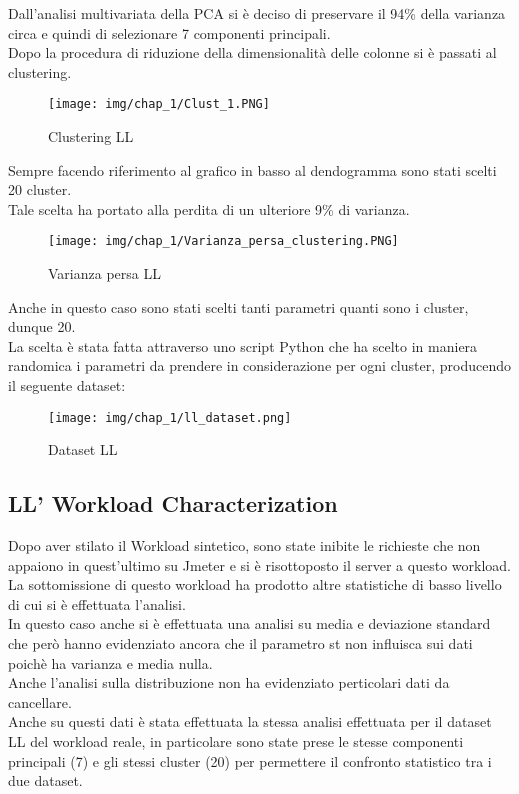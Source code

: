 \noindent
Dall'analisi multivariata della PCA si è deciso di preservare il 94\% della varianza circa e quindi di selezionare 7 componenti principali.\\
Dopo la procedura di riduzione della dimensionalità delle colonne si è passati al clustering.\\
\begin{figure}[H]
    \centering
    \texttt{[image: img/chap\_1/Clust\_1.PNG]}
    \caption{Clustering LL}
    \label{fig:clust_ll}
\end{figure}
\noindent
Sempre facendo riferimento al grafico in basso al dendogramma sono stati scelti 20 cluster.\\
Tale scelta ha portato alla perdita di un ulteriore 9\% di varianza.\\
\begin{figure}[H]
    \centering
    \texttt{[image: img/chap\_1/Varianza\_persa\_clustering.PNG]}
    \caption{Varianza persa LL}
    \label{fig:variance_loss}
\end{figure}
\noindent
Anche in questo caso sono stati scelti tanti parametri quanti sono i cluster, dunque 20.\\
La scelta è stata fatta attraverso uno script Python che ha scelto in maniera randomica i parametri da prendere in considerazione per ogni cluster, producendo il seguente dataset:
\begin{figure}[H]
    \centering
    \texttt{[image: img/chap\_1/ll\_dataset.png]}
    \caption{Dataset LL}
    \label{fig:data_selected_LL}
\end{figure}
\noindent
\subsection{LL' Workload Characterization}
Dopo aver stilato il Workload sintetico, sono state inibite le richieste che non appaiono in quest'ultimo su Jmeter e si è risottoposto il server a questo workload.\\
La sottomissione di questo workload ha prodotto altre statistiche di basso livello di cui si è effettuata l'analisi.\\
In questo caso anche si è effettuata una analisi su media e deviazione standard che però hanno evidenziato ancora che il parametro st non influisca sui dati poichè ha varianza e media nulla.\\
Anche l'analisi sulla distribuzione non ha evidenziato perticolari dati da cancellare.\\
Anche su questi dati è stata effettuata la stessa analisi effettuata per il dataset LL del workload reale, in particolare sono state prese le stesse componenti principali (7) e gli stessi cluster (20) per permettere il confronto statistico tra i due dataset.\\
